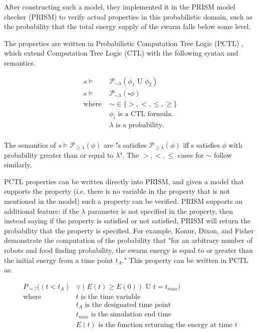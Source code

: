 \documentclass[11pt]{article}
\theoremstyle{definition}
\begin{document}
After constructing such a model, they implemented it in the PRISM model checker
(PRISM) to verify actual properties in this probabilistic domain, such
as the probability that the total energy supply of the swarm
falls below some level.

The properties are written in Probabilistic Computation Tree
Logic (PCTL) \cite{pctl}, which extend Computation Tree Logic (CTL)
with the following syntax and semantics.

\begin{align*}
    s \vDash & \mathcal{P}_{\sim\lambda}(\phi_1 \text{ U } \phi_2) \\
    s \vDash & \mathcal{P}_{\sim\lambda}(\square \phi) \\
    \text{where } & \sim \in \{ >, <, \leq, \geq \} \\
                  & \phi_i \text{ is a CTL formula.} \\
                  & \lambda \text{ is a probability.} \\
\end{align*}

The semantics of $ s \vDash \mathcal{P}_{\geq\lambda} ( \phi ) $ are
"s satisfies $ \mathcal{P}_{\geq\lambda} ( \phi ) $ iff s
satisfies $ \phi $ with probability greater than or equal
to $ \lambda $".
The $ >, <, \leq $ cases for $ \sim $ follow similarly.

PCTL properties can be written directly into PRISM, and
given a model that supports the property (i.e. there is
no variable in the property that is not mentioned
in the model) such a property can be verified.
PRISM supports an additional feature: if the $ \lambda $
parameter is not specified in the property, then
instead saying if the property is satisfied or not
satisfied, PRISM will return the probability that
the property is specified. For example, Konur,
Dixon, and Fisher demonstrate the computation of
the probability that "for an arbitrary number of robots
and food finding probability, the swarm energy is
equal to or greater than the initial energy from
a time point $ t_A $." This property can be written
in PCTL as:

\begin{align*}
    P_{=?}((t < t_A) & \vee (E(t) \geq E(0)) \text{ U } t = t_{max} ) \\
    \text{where } & t \text{ is the time variable} \\
                  & t_A \text{ is the designated time point} \\
                  & t_{max} \text{ is the simulation end time} \\
                  & E(t) \text{ is the function returning the energy at time } t
\end{align*}
\end{document}
